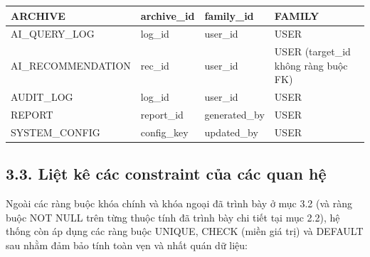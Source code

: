 \begin{small}
\begin{longtable}{|>{\raggedright\arraybackslash}p{3.0cm}|>{\raggedright\arraybackslash}p{2.0cm}|>{\raggedright\arraybackslash}p{4.0cm}|>{\raggedright\arraybackslash}p{4.0cm}|}
		ARCHIVE & archive\_id & family\_id & FAMILY \\ \hline
		AI\_\allowbreak QUERY\_\allowbreak LOG & log\_id & user\_id & USER \\ \hline
		AI\_\allowbreak RECOM\allowbreak MENDATION & rec\_id & user\_id & USER (target\_id không ràng buộc FK) \\ \hline
		AUDIT\_\allowbreak LOG & log\_id & user\_id & USER \\ \hline
		REPORT & report\_id & generated\_by & USER \\ \hline
		SYSTEM\_\allowbreak CONFIG & config\_key & updated\_by & USER \\ \hline
	\end{longtable}
\end{small}

\subsection{3.3. Liệt kê các constraint của các quan hệ}
\label{sec:constraint}

Ngoài các ràng buộc khóa chính và khóa ngoại đã trình bày ở mục 3.2 (và ràng buộc NOT NULL trên từng thuộc tính đã trình bày chi tiết tại mục 2.2), hệ thống còn áp dụng các ràng buộc UNIQUE, CHECK (miền giá trị) và DEFAULT sau nhằm đảm bảo tính toàn vẹn và nhất quán dữ liệu:

\renewcommand{\arraystretch}{1.3}
\setlength{\tabcolsep}{3pt}

